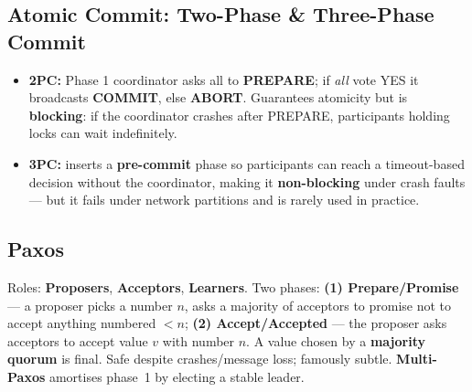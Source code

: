 \documentclass[11pt,a4paper]{article}
\begin{document}
\subsection{Atomic Commit: Two-Phase \& Three-Phase Commit}
\begin{center}
\end{center}

\begin{itemize}[leftmargin=*, itemsep=2pt]
  \item \textbf{2PC:} Phase 1 coordinator asks all to \textbf{PREPARE}; if \emph{all} vote YES it broadcasts \textbf{COMMIT}, else \textbf{ABORT}. Guarantees atomicity but is \textbf{blocking}: if the coordinator crashes after PREPARE, participants holding locks can wait indefinitely.
  \item \textbf{3PC:} inserts a \textbf{pre-commit} phase so participants can reach a timeout-based decision without the coordinator, making it \textbf{non-blocking} under crash faults --- but it fails under network partitions and is rarely used in practice.
\end{itemize}

\subsection{Paxos}
\begin{conceptbox}
Roles: \textbf{Proposers}, \textbf{Acceptors}, \textbf{Learners}. Two phases: \textbf{(1) Prepare/Promise} --- a proposer picks a number $n$, asks a majority of acceptors to promise not to accept anything numbered $<n$; \textbf{(2) Accept/Accepted} --- the proposer asks acceptors to accept value $v$ with number $n$. A value chosen by a \textbf{majority quorum} is final. Safe despite crashes/message loss; famously subtle. \textbf{Multi-Paxos} amortises phase~1 by electing a stable leader.
\end{conceptbox}
\end{document}

